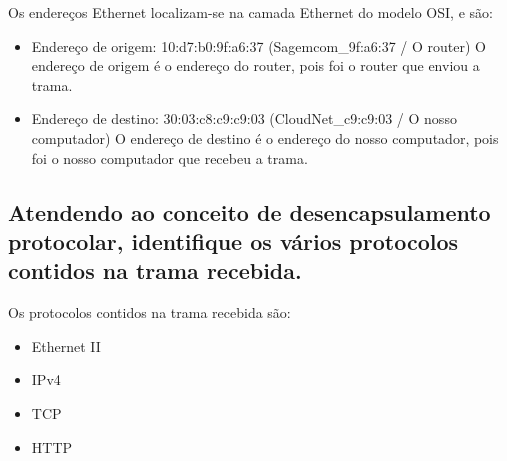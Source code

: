 Os endereços Ethernet localizam-se na camada Ethernet do modelo OSI, e são:
\begin{itemize}
    \item Endereço de origem: 10:d7:b0:9f:a6:37 (Sagemcom\_9f:a6:37 / O router) \linebreak
    O endereço de origem é o endereço do router, pois foi o router que enviou a trama.
    \item Endereço de destino: 30:03:c8:c9:c9:03 (CloudNet\_c9:c9:03 / O nosso computador) \linebreak
    O endereço de destino é o endereço do nosso computador, pois foi o nosso computador que recebeu a trama.
\end{itemize}

\subsection{Atendendo ao conceito de desencapsulamento protocolar, identifique os vários
protocolos contidos na trama recebida.}

Os protocolos contidos na trama recebida são:
\begin{itemize}
    \item Ethernet II
    \item IPv4
    \item TCP
    \item HTTP
\end{itemize}